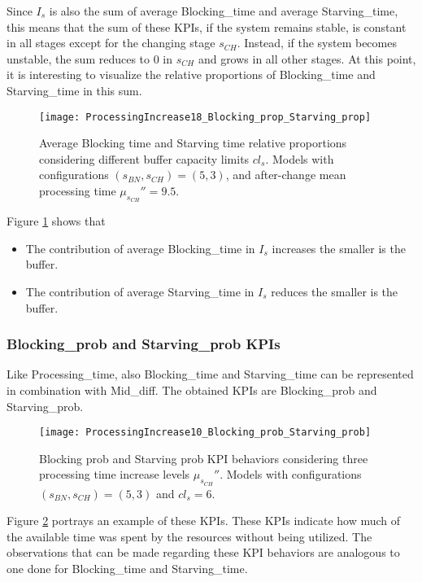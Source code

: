 Since $I_s$ is also the sum of average Blocking\_time and average Starving\_time, this means that the sum of these KPIs, if the system remains stable, is constant in all stages except for the changing stage $s_{CH}$. Instead, if the system becomes unstable, the sum reduces to $0$ in $s_{CH}$ and grows in all other stages. At this point, it is interesting to visualize the relative proportions of Blocking\_time and Starving\_time in this sum. 
\begin{figure}[h] 
\centering
\texttt{[image: ProcessingIncrease18\_Blocking\_prop\_Starving\_prop]}
\caption[Average Blocking time and Starving time relative proportions considering different buffer capacity limits]{Average Blocking time and Starving time relative proportions considering different buffer capacity limits $cl_s$. Models with configurations $(s_{BN},s_{CH})=(5,3)$, and after-change mean processing time $\mu_{s_{CH}}''=9.5$.}
\label{fig:Average Blocking time and Starving time relative proportions considering different buffer capacity limits}
\end{figure}
Figure \ref{fig:Average Blocking time and Starving time relative proportions considering different buffer capacity limits} shows that 
\begin{itemize}
\item The contribution of average Blocking\_time in $I_s$ increases the smaller is the buffer.
\item The contribution of average Starving\_time in $I_s$ reduces the smaller is the buffer.
\end{itemize}
\subsubsection{Blocking\_prob and Starving\_prob KPIs}
Like Processing\_time, also Blocking\_time and Starving\_time can be represented in combination with Mid\_diff. The obtained KPIs are Blocking\_prob and Starving\_prob.
\begin{figure}[h] 
\centering
\texttt{[image: ProcessingIncrease10\_Blocking\_prob\_Starving\_prob]}
\caption[Blocking prob and Starving prob KPI behaviors with different processing time increase levels]{Blocking prob and Starving prob KPI behaviors considering three processing time increase levels $\mu_{s_{CH}}''$. Models with configurations $(s_{BN},s_{CH})=(5,3)$ and $cl_s=6$.}
\label{fig:Blocking prob and Starving prob KPIs behavior with different processing time increase levels}
\end{figure}
Figure \ref{fig:Blocking prob and Starving prob KPIs behavior with different processing time increase levels} portrays an example of these KPIs. These KPIs indicate how much of the available time was spent by the resources without being utilized. The observations that can be made regarding these KPI behaviors are analogous to one done for Blocking\_time and Starving\_time. 
\newpage
